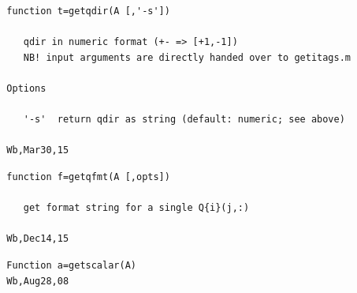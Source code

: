 \documentclass[twoside,12pt]{article}
\begin{document}
\pagebreak[3]



\begin{verbatim}
  function t=getqdir(A [,'-s'])
 
     qdir in numeric format (+- => [+1,-1])
     NB! input arguments are directly handed over to getitags.m
 
  Options
 
     '-s'  return qdir as string (default: numeric; see above)
 
  Wb,Mar30,15
\end{verbatim}

\pagebreak[3]



\begin{verbatim}
  function f=getqfmt(A [,opts])
 
     get format string for a single Q{i}(j,:)
 
  Wb,Dec14,15
\end{verbatim}

\pagebreak[3]



\begin{verbatim}
  Function a=getscalar(A)
  Wb,Aug28,08
\end{verbatim}

\pagebreak[3]


\end{document}
